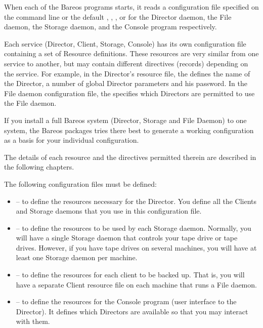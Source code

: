 

When each of the Bareos programs starts, it reads a configuration file
specified on the command line or the default , 
, , or  for the Director
daemon, the File daemon, the Storage daemon, and the Console program
respectively.

Each service (Director, Client, Storage, Console) has its own configuration
file containing a set of Resource definitions. These resources are very
similar from one service to another, but may contain different directives
(records) depending on the service. For example, in the Director's resource
file, the  defines the name of the Director, a number
of global Director parameters and his password. In the File daemon
configuration file, the  specifies which Directors are
permitted to use the File daemon.

If you install a full Bareos system (Director, Storage and File Daemon) to one system,
the Bareos packages tries there best to generate a working configuration as a basis for your individual configuration.

The details of each resource and the directives permitted therein are
described in the following chapters.

The following configuration files must be defined:

\begin{itemize}
\item
    -- to define the resources
   necessary for the Director. You define all the Clients  and Storage daemons
   that you use in this configuration file.
\item
    -- to define the resources to
   be used by each Storage daemon. Normally, you will have  a single Storage
   daemon that controls your tape drive or tape  drives. However, if you have
   tape drives on several machines,  you will have at least one Storage daemon
   per machine.
\item
    -- to define the resources for
   each client to be backed up. That is, you will have a separate  Client
   resource file on each machine that runs a File daemon.
\item
    -- to define the resources for
   the Console program (user interface to the Director).  It defines which
Directors are  available so that you may interact with them.
\end{itemize}



